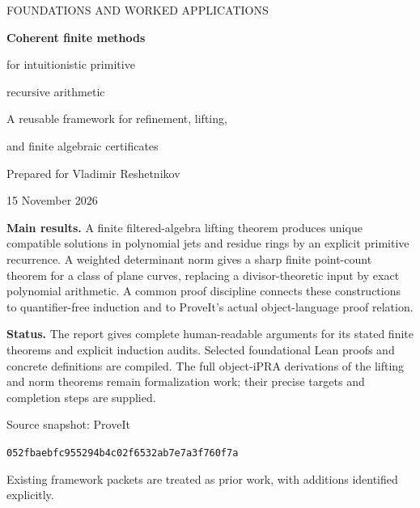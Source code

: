 \documentclass[11pt,oneside]{article}
\theoremstyle{definition}
\theoremstyle{remark}\newtheorem{remark}[theorem]{Remark}
\begin{document}
\begin{titlepage}
\vspace*{14mm}
{\color{accent}\large FOUNDATIONS AND WORKED APPLICATIONS\par}
\vspace{8mm}
{\color{ink}\Huge\bfseries Coherent finite methods\par}
\vspace{4mm}
{\LARGE for intuitionistic primitive\par recursive arithmetic\par}
\vspace{10mm}
{\large A reusable framework for refinement, lifting,\par and finite algebraic certificates\par}
\vspace{10mm}
Prepared for Vladimir Reshetnikov\par
15 November 2026\par
\vspace{10mm}
\begin{minipage}{0.94\textwidth}
\textbf{Main results.} A finite filtered-algebra lifting theorem produces
unique compatible solutions in polynomial jets and residue rings by an
explicit primitive recurrence. A weighted determinant norm gives a sharp
finite point-count theorem for a class of plane curves, replacing a
divisor-theoretic input by exact polynomial arithmetic. A common proof
discipline connects these constructions to quantifier-free induction and
to ProveIt's actual object-language proof relation.

\textbf{Status.} The report gives complete human-readable arguments for its
stated finite theorems and explicit induction audits. Selected foundational
Lean proofs and concrete definitions are compiled. The full object-iPRA
derivations of the lifting and norm theorems remain formalization work;
their precise targets and completion steps are supplied.
\end{minipage}
\vfill
{\small Source snapshot: ProveIt\par
\texttt{052fbaebfc955294b4c02f6532ab7e7a3f760f7a}\par
Existing framework packets are treated as prior work, with additions
identified explicitly.}
\end{titlepage}
\end{document}
